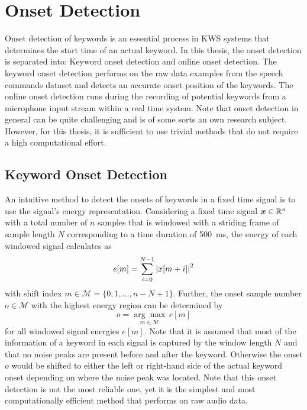 
\section{Onset Detection}\label{sec:signal_onset}
Onset detection of keywords is an essential process in KWS systems that determines the start time of an actual keyword.
In this thesis, the onset detection is separated into: Keyword onset detection and online onset detection.
The keyword onset detection performs on the raw data examples from the speech commands dataset and detects an accurate onset position of the keywords.
The online onset detection runs during the recording of potential keywords from a microphone input stream within a real time system.
Note that onset detection in general can be quite challenging and is of some sorts an own research subject.
However, for this thesis, it is sufficient to use trivial methods that do not require a high computational effort.



\subsection{Keyword Onset Detection}\label{sec:signal_onset_kw}
An intuitive method to detect the onsets of keywords in a fixed time signal is to use the signal's energy representation.
Considering a fixed time signal $\bm{x} \in \mathbb{R}^n$ with a total number of $n$ samples that is windowed with a striding frame of sample length $N$ corresponding to a time duration of \SI{500}{\milli\second}, the energy of each windowed signal calculates as
\begin{equation}\label{eq:e_win}
  e[m] = \sum_{i=0}^{N-1} \abs{x[m + i]}^2
\end{equation}
with shift index $m \in \mathcal{M} = \{0, 1, \dots, n - N + 1\}$.
Further, the onset sample number $o \in \mathcal{M}$ with the highest energy region can be determined by
\begin{equation}\label{eq:onset}
  o = \underset{m \in \mathcal{M}}{\arg \max} \, e[m]
\end{equation}
for all windowed signal energies $e[m]$.
Note that it is assumed that most of the information of a keyword in each signal is captured by the window length $N$ and that no noise peaks are present before and after the keyword. 
Otherwise the onset $o$ would be shifted to either the left or right-hand side of the actual keyword onset depending on where the noise peak was located.
Note that this onset detection is not the most reliable one, yet it is the simplest and most computationally efficient method that performs on raw audio data.

